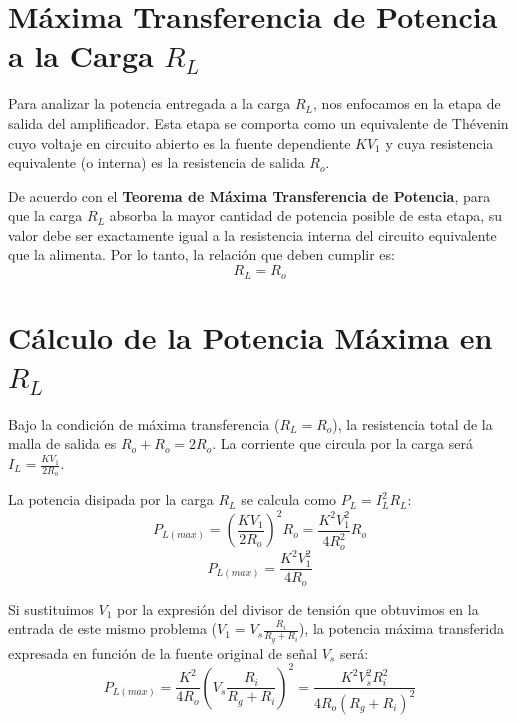 \documentclass[12pt, a4paper]{article}
\begin{document}
\section*{Máxima Transferencia de Potencia a la Carga $R_L$}
Para analizar la potencia entregada a la carga $R_L$, nos enfocamos en la etapa de salida del amplificador. Esta etapa se comporta como un equivalente de Thévenin cuyo voltaje en circuito abierto es la fuente dependiente $K V_1$ y cuya resistencia equivalente (o interna) es la resistencia de salida $R_o$.

De acuerdo con el \textbf{Teorema de Máxima Transferencia de Potencia}, para que la carga $R_L$ absorba la mayor cantidad de potencia posible de esta etapa, su valor debe ser exactamente igual a la resistencia interna del circuito equivalente que la alimenta. Por lo tanto, la relación que deben cumplir es:
\begin{equation}
    R_L = R_o
\end{equation}

\section*{Cálculo de la Potencia Máxima en $R_L$}
Bajo la condición de máxima transferencia ($R_L = R_o$), la resistencia total de la malla de salida es $R_o + R_o = 2R_o$. La corriente que circula por la carga será $I_L = \frac{K V_1}{2 R_o}$.

La potencia disipada por la carga $R_L$ se calcula como $P_L = I_L^2 R_L$:
\begin{equation*}
    P_{L(max)} = \left( \frac{K V_1}{2 R_o} \right)^2 R_o = \frac{K^2 V_1^2}{4 R_o^2} R_o
\end{equation*}
\begin{equation}
    P_{L(max)} = \frac{K^2 V_1^2}{4 R_o}
\end{equation}

Si sustituimos $V_1$ por la expresión del divisor de tensión que obtuvimos en la entrada de este mismo problema ($V_1 = V_s \frac{R_i}{R_g + R_i}$), la potencia máxima transferida expresada en función de la fuente original de señal $V_s$ será:
\begin{equation}
    P_{L(max)} = \frac{K^2}{4 R_o} \left( V_s \frac{R_i}{R_g + R_i} \right)^2 = \frac{K^2 V_s^2 R_i^2}{4 R_o (R_g + R_i)^2}
\end{equation}
\end{document}
